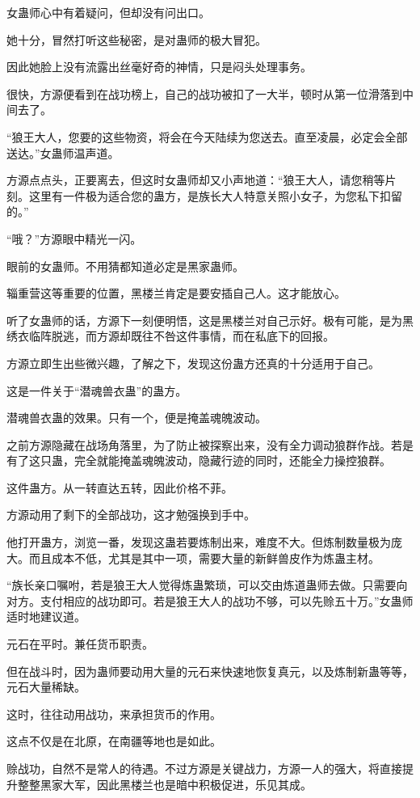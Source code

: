 \begin{this_body}
女蛊师心中有着疑问，但却没有问出口。

她十分，冒然打听这些秘密，是对蛊师的极大冒犯。

因此她脸上没有流露出丝毫好奇的神情，只是闷头处理事务。

很快，方源便看到在战功榜上，自己的战功被扣了一大半，顿时从第一位滑落到中间去了。

“狼王大人，您要的这些物资，将会在今天陆续为您送去。直至凌晨，必定会全部送达。”女蛊师温声道。

方源点点头，正要离去，但这时女蛊师却又小声地道：“狼王大人，请您稍等片刻。这里有一件极为适合您的蛊方，是族长大人特意关照小女子，为您私下扣留的。”

“哦？”方源眼中精光一闪。

眼前的女蛊师。不用猜都知道必定是黑家蛊师。

辎重营这等重要的位置，黑楼兰肯定是要安插自己人。这才能放心。

听了女蛊师的话，方源下一刻便明悟，这是黑楼兰对自己示好。极有可能，是为黑绣衣临阵脱逃，而方源却既往不咎这件事情，而在私底下的回报。

方源立即生出些微兴趣，了解之下，发现这份蛊方还真的十分适用于自己。

这是一件关于“潜魂兽衣蛊”的蛊方。

潜魂兽衣蛊的效果。只有一个，便是掩盖魂魄波动。

之前方源隐藏在战场角落里，为了防止被探察出来，没有全力调动狼群作战。若是有了这只蛊，完全就能掩盖魂魄波动，隐藏行迹的同时，还能全力操控狼群。

这件蛊方。从一转直达五转，因此价格不菲。

方源动用了剩下的全部战功，这才勉强换到手中。

他打开蛊方，浏览一番，发现这蛊若要炼制出来，难度不大。但炼制数量极为庞大。而且成本不低，尤其是其中一项，需要大量的新鲜兽皮作为炼蛊主材。

“族长亲口嘱咐，若是狼王大人觉得炼蛊繁琐，可以交由炼道蛊师去做。只需要向对方。支付相应的战功即可。若是狼王大人的战功不够，可以先赊五十万。”女蛊师适时地建议道。

元石在平时。兼任货币职责。

但在战斗时，因为蛊师要动用大量的元石来快速地恢复真元，以及炼制新蛊等等，元石大量稀缺。

这时，往往动用战功，来承担货币的作用。

这点不仅是在北原，在南疆等地也是如此。

赊战功，自然不是常人的待遇。不过方源是关键战力，方源一人的强大，将直接提升整整黑家大军，因此黑楼兰也是暗中积极促进，乐见其成。


\end{this_body}
